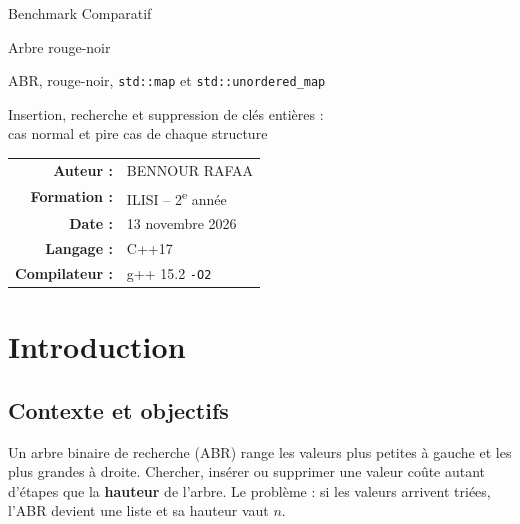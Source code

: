 \documentclass[12pt,a4paper]{report}
\begin{document}
\begin{titlepage}
  \centering
  \vspace*{2cm}
  {\huge Benchmark Comparatif\par}
  \vspace{0.4cm}
  {\LARGE Arbre rouge-noir\par}
  \vspace{0.3cm}
  {\Large ABR, rouge-noir, \texttt{std::map} et \texttt{std::unordered\_map}\par}
  \vspace{1.3cm}
  {\large Insertion, recherche et suppression de clés entières :\\[2pt]
  cas normal et pire cas de chaque structure\par}
  \vspace{1.3cm}
  \vspace{1.3cm}

  \begin{tabular}{r@{\quad}l}
    \textbf{Auteur :} & BENNOUR RAFAA \\
    \textbf{Formation :} & ILISI -- 2\textsuperscript{e} année \\
    \textbf{Date :} & 13 novembre 2026 \\
    \textbf{Langage :} & C++17 \\
    \textbf{Compilateur :} & g++ 15.2 \texttt{-O2} \\
  \end{tabular}
\end{titlepage}

\setcounter{tocdepth}{1}
\tableofcontents

\chapter{Introduction}

\section{Contexte et objectifs}
Un arbre binaire de recherche (ABR) range les valeurs plus petites à gauche et les plus grandes à droite. Chercher, insérer ou supprimer une valeur coûte autant d'étapes que la \textbf{hauteur} de l'arbre. Le problème : si les valeurs arrivent triées, l'ABR devient une liste et sa hauteur vaut $n$.
\end{document}
